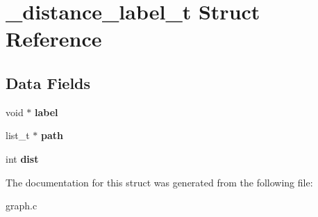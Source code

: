 \hypertarget{struct__distance__label__t}{}\section{\+\_\+distance\+\_\+label\+\_\+t Struct Reference}
\label{struct__distance__label__t}
\subsection*{Data Fields}
\begin{DoxyCompactItemize}
\item 
\hypertarget{struct__distance__label__t_a9727371f649142a741d5070a82f5878d}{}void $\ast$ {\bfseries label}\label{struct__distance__label__t_a9727371f649142a741d5070a82f5878d}

\item 
\hypertarget{struct__distance__label__t_af33f0d4f68780ceb38e73c1101274d79}{}list\+\_\+t $\ast$ {\bfseries path}\label{struct__distance__label__t_af33f0d4f68780ceb38e73c1101274d79}

\item 
\hypertarget{struct__distance__label__t_adbd84fd1b26dc8fd8eab79a772216aee}{}int {\bfseries dist}\label{struct__distance__label__t_adbd84fd1b26dc8fd8eab79a772216aee}

\end{DoxyCompactItemize}


The documentation for this struct was generated from the following file\+:\begin{DoxyCompactItemize}
\item 
graph.\+c\end{DoxyCompactItemize}
